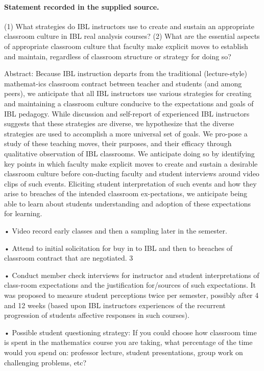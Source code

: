 \documentclass[11pt]{article}
\begin{document}
\paragraph{Statement recorded in the supplied source.}
(1) What strategies do IBL instructors use to create and sustain an appropriate classroom culture in IBL real analysis courses? (2) What are the essential aspects of appropriate classroom culture that faculty make explicit moves to establish and maintain, regardless of classroom structure or strategy for doing so?

Abstract: Because IBL instruction departs from the traditional (lecture-style) mathemat-ics classroom contract between teacher and students (and among peers), we anticipate that all IBL instructors use various strategies for creating and maintaining a classroom culture conducive to the expectations and goals of IBL pedagogy. While discussion and self-report of experienced IBL instructors suggests that these strategies are diverse, we hypothesize that the diverse strategies are used to accomplish a more universal set of goals. We pro-pose a study of these teaching moves, their purposes, and their efficacy through qualitative observation of IBL classrooms. We anticipate doing so by identifying key points in which faculty make explicit moves to create and sustain a desirable classroom culture before con-ducting faculty and student interviews around video clips of such events. Eliciting student interpretation of such events and how they arise to breaches of the intended classroom ex-pectations, we anticipate being able to learn about students understanding and adoption of these expectations for learning.

• Video record early classes and then a sampling later in the semester.

• Attend to initial solicitation for buy in to IBL and then to breaches of classroom contract that are negotiated. 3

• Conduct member check interviews for instructor and student interpretations of class-room expectations and the justification for/sources of such expectations. It was proposed to measure student perceptions twice per semester, possibly after 4 and 12 weeks (based upon IBL instructors experiences of the recurrent progression of students affective responses in such courses).

• Possible student questioning strategy: If you could choose how classroom time is spent in the mathematics course you are taking, what percentage of the time would you spend on: professor lecture, student presentations, group work on challenging problems, etc?
\end{document}
